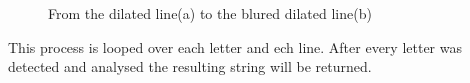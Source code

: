 \begin{figure}[H]
    \centering
    \qquad
    \caption{From the dilated line(a) to the blured dilated line(b)}
\end{figure}

This process is looped over each letter and ech line.
After every letter was detected and analysed the resulting string will be returned.
